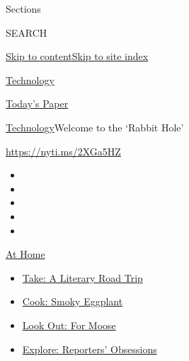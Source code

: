 Sections

SEARCH

\protect\hyperlink{site-content}{Skip to
content}\protect\hyperlink{site-index}{Skip to site index}

\href{https://www.nytimes3xbfgragh.onion/section/technology}{Technology}

\href{https://myaccount.nytimes3xbfgragh.onion/auth/login?response_type=cookie\&client_id=vi}{}

\href{https://www.nytimes3xbfgragh.onion/section/todayspaper}{Today's
Paper}

\href{/section/technology}{Technology}\textbar{}Welcome to the `Rabbit
Hole'

\url{https://nyti.ms/2XGa5HZ}

\begin{itemize}
\item
\item
\item
\item
\item
\end{itemize}

\href{https://www.nytimes3xbfgragh.onion/spotlight/at-home?action=click\&pgtype=Article\&state=default\&region=TOP_BANNER\&context=at_home_menu}{At
Home}

\begin{itemize}
\tightlist
\item
  \href{https://www.nytimes3xbfgragh.onion/2020/07/28/books/time-for-a-literary-road-trip.html?action=click\&pgtype=Article\&state=default\&region=TOP_BANNER\&context=at_home_menu}{Take:
  A Literary Road Trip}
\item
  \href{https://www.nytimes3xbfgragh.onion/2020/07/29/magazine/bored-with-your-home-cooking-some-smoky-eggplant-will-fix-that.html?action=click\&pgtype=Article\&state=default\&region=TOP_BANNER\&context=at_home_menu}{Cook:
  Smoky Eggplant}
\item
  \href{https://www.nytimes3xbfgragh.onion/2020/07/27/travel/moose-michigan-isle-royale.html?action=click\&pgtype=Article\&state=default\&region=TOP_BANNER\&context=at_home_menu}{Look
  Out: For Moose}
\item
  \href{https://www.nytimes3xbfgragh.onion/interactive/2020/at-home/even-more-reporters-editors-diaries-lists-recommendations.html?action=click\&pgtype=Article\&state=default\&region=TOP_BANNER\&context=at_home_menu}{Explore:
  Reporters' Obsessions}
\end{itemize}

